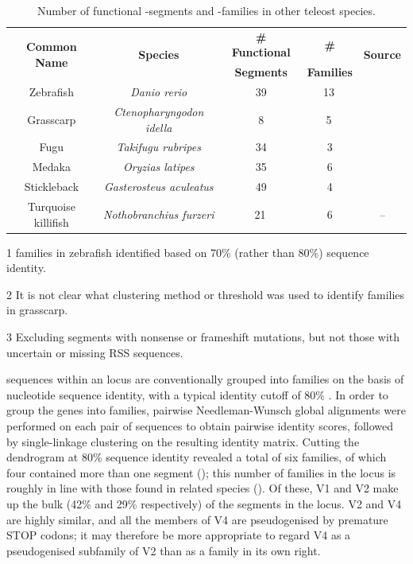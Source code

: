 \begin{table}[hb]
	\centering
	\begin{threeparttable}
	\centering
	\caption{Number of functional \vh-segments and \vh-families in other teleost species.}
	\label{tab:teleost-vh-counts}
	\begin{tabular}{ccccc}\toprule
	\multirow{2}{*}{	\textbf{Common Name}} & \multirow{2}{*}{\textbf{Species}} & \textbf{\# Functional} & \textbf{	\# \vh} & \multirow{2}{*}{\textbf{Source}} \\
	& & \textbf{\vh Segments} & \textbf{Families} & \\\midrule
	Zebrafish & \textit{Danio rerio} & 39 & 13\,\tnote{1} & \parencite{magadan2015fishrepertoires} \\
	Grasscarp & \textit{Ctenopharyngodon idella} & 8 & 5\,\tnote{2} & \parencite{xiao2010grasscarp} \\
	Fugu & \textit{Takifugu rubripes} & 34 & 3 & \parencite{magadan2015fishrepertoires} \\
	Medaka & \textit{Oryzias latipes} & 35 & 6 & \parencite{fillatreau2013astonishing,magadan2011medaka} \\
	Stickleback & \textit{Gasterosteus aculeatus} & 49 & 4 & \parencite{magadan2015fishrepertoires} \\
	Turquoise killifish & \textit{Nothobranchius furzeri} & 21\,\tnote{3} & 6 & -- \\
	\bottomrule\end{tabular}
	\begin{tablenotes}
	\item[1] \vh families in zebrafish identified based on 70\% (rather than 80\%) sequence identity.
	\item[2] It is not clear what clustering method or threshold was used to identify \vh families in grasscarp.
	\item[3] Excluding \vh segments with nonsense or frameshift mutations, but not those with uncertain or missing RSS sequences.
	\end{tablenotes}
	\end{threeparttable}
\end{table}
	
\vh sequences within an \igh{} locus are conventionally grouped into families on the basis of nucleotide sequence identity, with a typical identity cutoff of 80\% \parencite{magadan2015fishrepertoires}. In order to group the \Nfu \vh genes into families, pairwise Needleman-Wunsch global alignments were performed on each pair of \vh sequences to obtain pairwise identity scores, followed by single-linkage clustering on the resulting identity matrix. Cutting the dendrogram at 80\% sequence identity revealed a total of six \vh families, of which four contained more than one \vh segment (); this number of \vh families in the \Nfu locus is roughly in line with those found in related species (). Of these, V1 and V2 make up the bulk (42\% and 29\% respectively) of the \vh segments in the locus. V2 and V4 are highly similar, and all the members of V4 are pseudogenised by premature STOP codons; it may therefore be more appropriate to regard V4 as a pseudogenised subfamily of V2 than as a \vh family in its own right.

